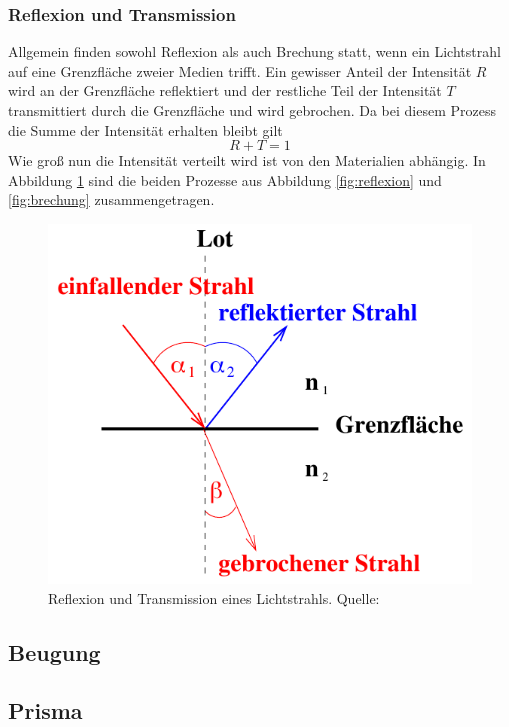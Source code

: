 \subsubsection*{Reflexion und Transmission}
\label{sec:RefTrans}
Allgemein finden sowohl Reflexion als auch Brechung statt, wenn ein Lichtstrahl auf eine Grenzfläche zweier 
Medien trifft. Ein gewisser Anteil der Intensität $R$ wird an der Grenzfläche reflektiert und der restliche 
Teil der Intensität $T$ transmittiert durch die Grenzfläche und wird gebrochen. Da bei diesem Prozess die 
Summe der Intensität erhalten bleibt gilt
\begin{equation}
    R+T=1
\end{equation}
Wie groß nun die Intensität verteilt wird ist von den Materialien abhängig. In Abbildung \ref{fig:RefTrans}
sind die beiden Prozesse aus Abbildung \ref{fig:reflexion} und \ref{fig:brechung} zusammengetragen.
\begin{figure}[H]
    \centering
    \includegraphics[scale = 0.5]{pictures/ReflexionTransmission.png}
    \caption{Reflexion und Transmission eines Lichtstrahls. Quelle: \cite{AP01}}
    \label{fig:RefTrans}
\end{figure}

\subsection{Beugung}
\label{sec:beugung}

\subsection{Prisma}
\label{sec:Prisma}
